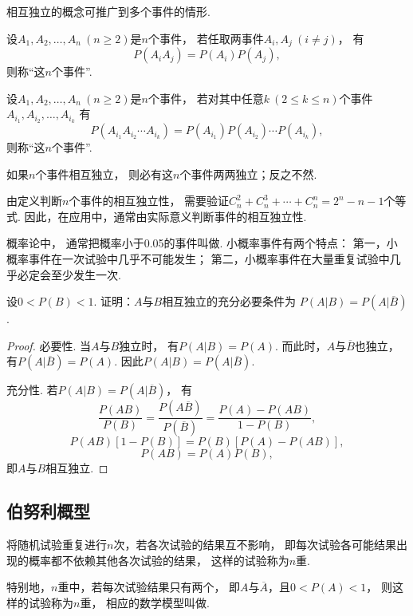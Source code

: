 相互独立的概念可推广到多个事件的情形.
\begin{definition}
设\(A_1,A_2,\dotsc,A_n\ (n \geq 2)\)是\(n\)个事件，
若任取两事件\(A_i,A_j\ (i \neq j)\)，
有\[
	P(A_i A_j) = P(A_i) P(A_j),
\]
则称“这\(n\)个事件”.
\end{definition}

\begin{definition}
设\(A_1,A_2,\dotsc,A_n\ (n \geq 2)\)是\(n\)个事件，
若对其中任意\(k\ (2 \leq k \leq n)\)个事件\(A_{i_1},A_{i_2},\dotsc,A_{i_k}\)
有\[
	P(A_{i_1} A_{i_2} \dotsm A_{i_k})
	= P(A_{i_1}) P(A_{i_2}) \dotsm P(A_{i_k}),
\]
则称“这\(n\)个事件”.
\end{definition}

\begin{theorem}
如果\(n\)个事件相互独立，
则必有这\(n\)个事件两两独立；反之不然.
\end{theorem}

由定义判断\(n\)个事件的相互独立性，
需要验证\(C_n^2+C_n^3+\dotsb+C_n^n=2^n-n-1\)个等式.
因此，在应用中，通常由实际意义判断事件的相互独立性.

概率论中，
通常把概率小于0.05的事件叫做.
小概率事件有两个特点：
第一，小概率事件在一次试验中几乎不可能发生；
第二，小概率事件在大量重复试验中几乎必定会至少发生一次.

\begin{example}
设\(0<P(B)<1\).
证明：\(A\)与\(B\)相互独立的充分必要条件为
\(P(A \vert B) = P(A \vert \overline{B})\).
\begin{proof}
必要性.
当\(A\)与\(B\)独立时，
有\(P(A \vert B) = P(A)\).
而此时，\(A\)与\(\overline{B}\)也独立，
有\(P(A \vert \overline{B}) = P(A)\).
因此\(P(A \vert B) = P(A \vert \overline{B})\).

充分性.
若\(P(A \vert B) = P(A \vert \overline{B})\)，
有\[
	\frac{P(AB)}{P(B)}
	= \frac{P(A\overline{B})}{P(\overline{B})}
	= \frac{P(A)-P(AB)}{1-P(B)},
\]\[
	P(AB) [1-P(B)] = P(B) [P(A)-P(AB)],
\]\[
	P(AB) = P(A) P(B),
\]
即\(A\)与\(B\)相互独立.
\end{proof}
\end{example}

\subsection{伯努利概型}
\begin{definition}
将随机试验重复进行\(n\)次，若各次试验的结果互不影响，
即每次试验各可能结果出现的概率都不依赖其他各次试验的结果，
这样的试验称为\(n\)重.

特别地，\(n\)重中，若每次试验结果只有两个，
即\(A\)与\(\overline{A}\)，且\(0 < P(A) < 1\)，
则这样的试验称为\(n\)重，
相应的数学模型叫做.
\end{definition}

